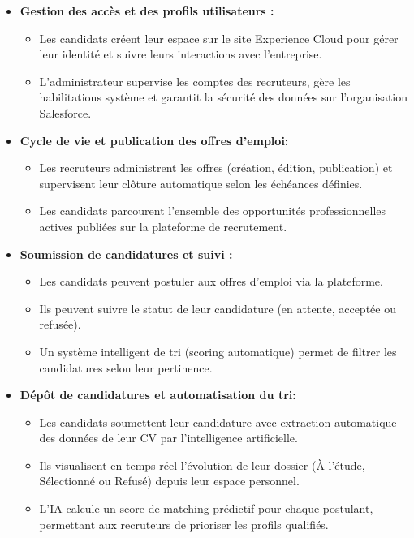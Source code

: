 \hspace{0.5cm}

\begin{itemize}
    \item \textbf{Gestion des accès et des profils utilisateurs :}
    \begin{itemize}
        \item[--]  Les candidats créent leur espace sur le site Experience Cloud pour gérer leur identité et suivre leurs interactions avec l'entreprise.
        \item[--] L'administrateur supervise les comptes des recruteurs, gère les habilitations système et garantit la sécurité des données sur l'organisation Salesforce.
    \end{itemize}
\hspace{0.5cm}

    \item \textbf{Cycle de vie et publication des offres d’emploi:}
\begin{itemize}
    \item[--] Les recruteurs administrent les offres (création, édition, publication) et supervisent leur clôture automatique selon les échéances définies.
     \item[--] Les candidats parcourent l'ensemble des opportunités professionnelles actives publiées sur la plateforme de recrutement.
    \end{itemize} 
\hspace{0.5cm}
    
    \item \textbf{Soumission de candidatures et suivi :}
    \begin{itemize}
        \item[--] Les candidats peuvent postuler aux offres d’emploi via la plateforme.
        \item[--] Ils peuvent suivre le statut de leur candidature (en attente, acceptée ou refusée).
        \item[--] Un système intelligent de tri (scoring automatique) permet de filtrer les candidatures selon leur pertinence.
    \end{itemize}
 \hspace{0.5cm}
    
    \item \textbf{ Dépôt de candidatures et automatisation du tri:}
    \begin{itemize}
        \item[--] Les candidats soumettent leur candidature avec extraction automatique des données de leur CV par l'intelligence artificielle.

        \item[--]Ils visualisent en temps réel l'évolution de leur dossier (À l'étude, Sélectionné ou Refusé) depuis leur espace personnel.

        \item[--] L'IA calcule un score de matching prédictif pour chaque postulant, permettant aux recruteurs de prioriser les profils qualifiés. \end{itemize}

    \end{itemize}
\hspace{0.5cm}


